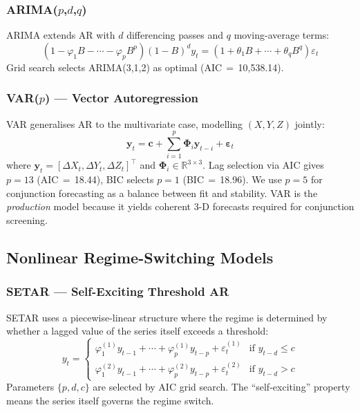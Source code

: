 \documentclass[conference]{IEEEtran}
\begin{document}
\subsubsection{ARIMA($p$,$d$,$q$)}
ARIMA extends AR with $d$ differencing passes and $q$ moving-average terms:
\begin{equation}
(1 - \varphi_1 B - \cdots - \varphi_p B^p)(1-B)^d y_t =
(1 + \theta_1 B + \cdots + \theta_q B^q)\varepsilon_t
\label{eq:arima}
\end{equation}
Grid search selects ARIMA(3,1,2) as optimal (AIC\,$=$\,10{,}538.14).

\subsubsection{VAR($p$) --- Vector Autoregression}
VAR generalises AR to the multivariate case, modelling $(X, Y, Z)$ jointly:
\begin{equation}
\mathbf{y}_t = \mathbf{c} + \sum_{i=1}^{p} \boldsymbol{\Phi}_i \mathbf{y}_{t-i}
+ \boldsymbol{\varepsilon}_t
\label{eq:var}
\end{equation}
where $\mathbf{y}_t = [\Delta X_t, \Delta Y_t, \Delta Z_t]^\top$ and
$\boldsymbol{\Phi}_i \in \mathbb{R}^{3 \times 3}$. Lag selection via AIC
gives $p = 13$ (AIC\,$=$\,18.44), BIC selects $p = 1$ (BIC\,$=$\,18.96).
We use $p=5$ for conjunction forecasting as a balance between fit and
stability. VAR is the \emph{production} model because it yields coherent 3-D
forecasts required for conjunction screening.

\subsection{Nonlinear Regime-Switching Models}

\subsubsection{SETAR --- Self-Exciting Threshold AR}
SETAR \cite{tong1983} uses a piecewise-linear structure where the regime is
determined by whether a lagged value of the series itself exceeds a threshold:
\begin{equation}
y_t =
\begin{cases}
\varphi_1^{(1)} y_{t-1} + \cdots + \varphi_p^{(1)} y_{t-p} + \varepsilon_t^{(1)}
  & \text{if } y_{t-d} \leq c \\[4pt]
\varphi_1^{(2)} y_{t-1} + \cdots + \varphi_p^{(2)} y_{t-p} + \varepsilon_t^{(2)}
  & \text{if } y_{t-d} > c
\end{cases}
\label{eq:setar}
\end{equation}
Parameters $\{p, d, c\}$ are selected by AIC grid search. The
``self-exciting'' property means the series itself governs the regime switch.
\end{document}
